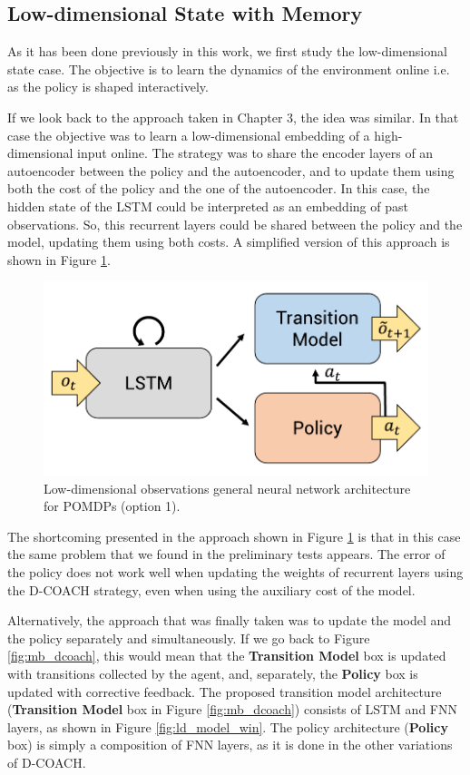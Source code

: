 \newpage

\subsection{Low-dimensional State with Memory}
\label{sec:ld_memory}
As it has been done previously in this work, we first study the low-dimensional state case. The objective is to learn the dynamics of the environment online i.e. as the policy is shaped interactively. 

If we look back to the approach taken in Chapter 3, the idea was similar. In that case the objective was to learn a low-dimensional embedding of a high-dimensional input online. The strategy was to share the encoder layers of an autoencoder between the policy and the autoencoder, and to update them using both the cost of the policy and the one of the autoencoder. In this case, the hidden state of the LSTM could be interpreted as an embedding of past observations. So, this recurrent layers could be shared between the policy and the model, updating them using both costs. A simplified version of this approach is shown in Figure \ref{fig:ld_model_rip}.

\begin{figure}[h]
    \centering
    \includegraphics[width=0.6\linewidth]{imagenes/cap4/ld_model_rip.pdf}
    \caption{Low-dimensional observations general neural network architecture for POMDPs (option 1).}
    \label{fig:ld_model_rip}
\end{figure}

The shortcoming presented in the approach shown in Figure \ref{fig:ld_model_rip} is that in this case the same problem that we found in the preliminary tests appears. The error of the policy does not work well when updating the weights of recurrent layers using the D-COACH strategy, even when using the auxiliary cost of the model. 

Alternatively, the approach that was finally taken was to update the model and the policy separately and simultaneously. If we go back to Figure \ref{fig:mb_dcoach}, this would mean that the \textbf{Transition Model} box is updated with transitions collected by the agent, and, separately, the \textbf{Policy} box is updated with corrective feedback. The proposed transition model architecture (\textbf{Transition Model} box in Figure \ref{fig:mb_dcoach}) consists of LSTM and FNN layers, as shown in Figure \ref{fig:ld_model_win}. The policy architecture (\textbf{Policy} box) is simply a composition of FNN layers, as it is done in the other variations of D-COACH.

